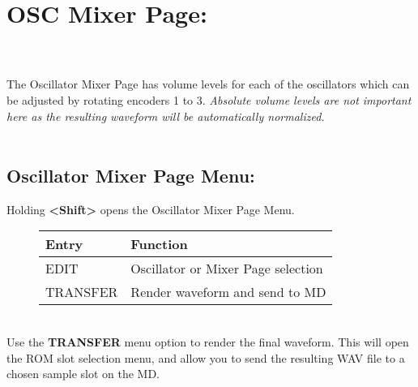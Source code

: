 \section{OSC Mixer Page:}
\\\\
The Oscillator Mixer Page has volume levels for each of the oscillators which can be adjusted by rotating encoders 1 to 3. \textit{Absolute volume levels are not important here as the resulting waveform will be automatically normalized.}\\
\\
\subsection{Oscillator Mixer Page Menu:}
Holding \textbf{<Shift>} opens the Oscillator Mixer Page Menu.
\begin{figure}[hb]
    \begin{tabular}{|l|l|}
    \hline
    \rowcolor[HTML]{C0C0C0}
    Entry     & Function \\ \hline
    EDIT      & Oscillator or Mixer Page selection \\ \hline
    TRANSFER  & Render waveform and send to MD\\ \hline
    \end{tabular}
\end{figure}
\\
Use the \textbf{TRANSFER} menu option to render the final waveform. This will open the ROM slot selection menu, and allow you to send the resulting WAV file to a chosen sample slot on the MD.